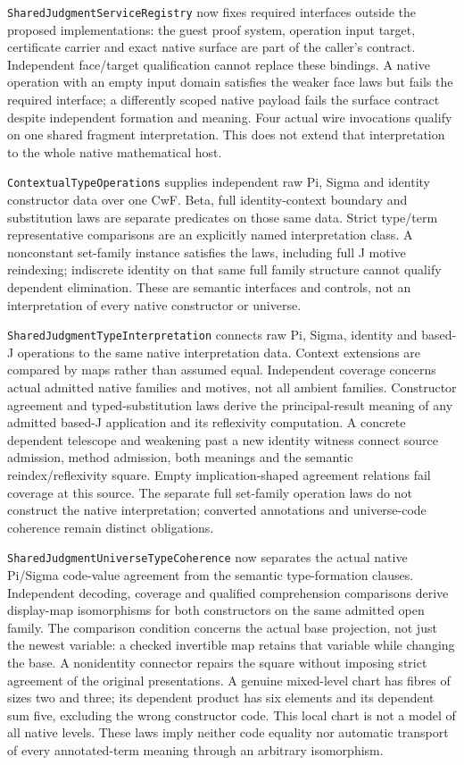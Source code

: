 \documentclass[11pt]{article}
\theoremstyle{definition}
\theoremstyle{remark}
\begin{document}
\nolinkurl{SharedJudgmentServiceRegistry} now fixes required interfaces outside
the proposed implementations: the guest proof system, operation input target,
certificate carrier and exact native surface are part of the caller's
contract. Independent face/target qualification cannot replace these bindings.
A native operation with an empty input domain satisfies the weaker face laws
but fails the required interface; a differently scoped native payload fails
the surface contract despite independent formation and meaning. Four actual
wire invocations qualify on one shared fragment interpretation. This does not
extend that interpretation to the whole native mathematical host.

\nolinkurl{ContextualTypeOperations} supplies independent raw Pi, Sigma and
identity constructor data over one CwF. Beta, full identity-context boundary
and substitution laws are separate predicates on those same data. Strict
type/term representative comparisons are an explicitly named interpretation
class. A nonconstant set-family instance satisfies the laws, including full
J motive reindexing; indiscrete identity on that same full family structure
cannot qualify dependent elimination. These are semantic interfaces and
controls, not an interpretation of every native constructor or universe.

\nolinkurl{SharedJudgmentTypeInterpretation} connects raw Pi, Sigma, identity
and based-J operations to the same native interpretation data. Context
extensions are compared by maps rather than assumed equal. Independent
coverage concerns actual admitted native families and motives, not all
ambient families. Constructor agreement and typed-substitution laws derive
the principal-result meaning of any admitted based-J application and its
reflexivity computation. A concrete dependent telescope and weakening past a
new identity witness connect source admission, method admission, both meanings
and the semantic reindex/reflexivity square. Empty implication-shaped
agreement relations fail coverage at this source. The separate full set-family
operation laws do not construct the native interpretation; converted
annotations and universe-code coherence remain distinct obligations.

\nolinkurl{SharedJudgmentUniverseTypeCoherence} now separates the actual
native Pi/Sigma code-value agreement from the semantic type-formation
clauses. Independent decoding, coverage and qualified comprehension
comparisons derive display-map isomorphisms for both constructors on the
same admitted open family. The comparison condition concerns the actual
base projection, not just the newest variable: a checked invertible map
retains that variable while changing the base. A nonidentity connector
repairs the square without imposing strict agreement of the original
presentations. A genuine mixed-level chart has fibres of sizes two and
three; its dependent product has six elements and its dependent sum five,
excluding the wrong constructor code. This local chart is not a model of
all native levels. These laws imply neither code equality nor automatic
transport of every annotated-term meaning through an arbitrary isomorphism.
\end{document}
